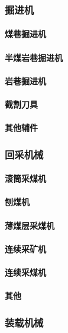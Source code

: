 \documentclass[UTF8]{../../ApplicationUniverse}
\begin{document}
        \subsubsection{掘进机}
            \paragraph{煤巷掘进机}
            \paragraph{半煤岩巷掘进机}
            \paragraph{岩巷掘进机}
            \paragraph{截割刀具}
            \paragraph{其他辅件}
        \subsubsection{回采机械}
            \paragraph{滚筒采煤机}
            \paragraph{刨煤机}
            \paragraph{薄煤层采煤机}
            \paragraph{连续采矿机}
            \paragraph{连续采煤机}
            \paragraph{其他}
        \subsubsection{装载机械}
\end{document}
